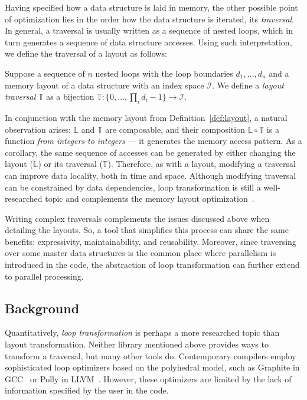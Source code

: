 Having specified how a data structure is laid in memory, the other possible point of optimization lies in the order how the data structure is iterated, its \emph{traversal}. In general, a traversal is usually written as a sequence of nested loops, which in turn generates a sequence of data structure accesses. Using such interpretation, we define the traversal of a layout as follows:

\begin{defn}
 \label{def:traversal}
 Suppose a sequence of $n$ nested loops with the loop boundaries $d_1, \dots, d_n$ and a memory layout of a data structure with an index space $\mathcal{I}$. We define a \emph{layout traversal} $\mathbb{T}$ as a bijection $\mathbb{T}: \{0, \dots, \prod_{i}d_i - 1\} \to \mathcal{I}$.
\end{defn}

In conjunction with the memory layout from Definition~\ref{def:layout}, a natural observation arises: $\mathbb{L}$ and $\mathbb{T}$ are composable, and their composition $\mathbb{L} \circ \mathbb{T}$ is a function \emph{from integers to integers} --- it generates the memory access pattern. As a corollary, the same sequence of accesses can be generated by either changing the layout ($\mathbb{L}$) or its traversal ($\mathbb{T}$). Therefore, as with a layout, modifying a traversal can improve data locality, both in time and space. Although modifying traversal can be constrained by data dependencies, loop transformation is still a well-researched topic and complements the memory layout optimization~\cite{clauss2000automatic}.

Writing complex traversals complements the issues discussed above when detailing the layouts. So, a tool that simplifies this process can share the same benefits: expressivity, maintainability, and reusability. Moreover, since traversing over some master data structures is the common place where parallelism is introduced in the code, the abstraction of loop transformation can further extend to parallel processing.

\subsection{Background}

Quantitatively, \emph{loop transformation} is perhaps a more researched topic than layout transformation. Neither library mentioned above provides ways to transform a traversal, but many other tools do. Contemporary compilers employ sophisticated loop optimizers based on the polyhedral model, such as Graphite in GCC~\cite{trifunovic2010graphite} or Polly in LLVM~\cite{grosser2012polly}. However, these optimizers are limited by the lack of information specified by the user in the code.

